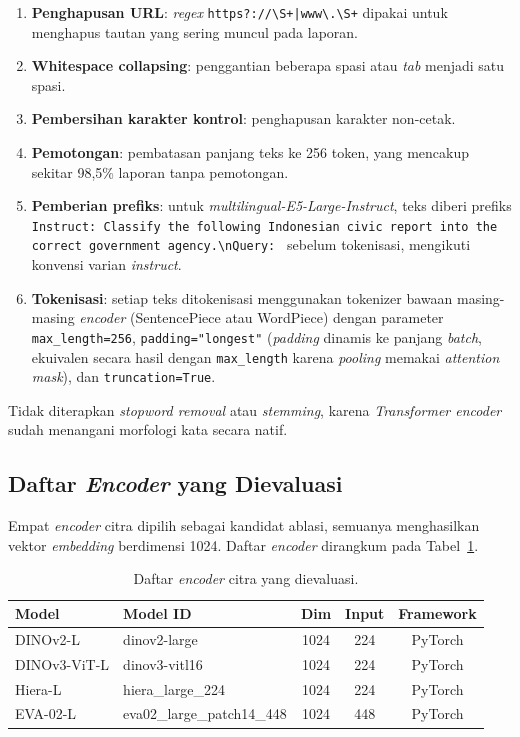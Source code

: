 \begin{enumerate}
    \item \textbf{Penghapusan URL}: \textit{regex} \texttt{https?://\textbackslash S+|www\textbackslash .\textbackslash S+} dipakai untuk menghapus tautan yang sering muncul pada laporan.
    \item \textbf{Whitespace collapsing}: penggantian beberapa spasi atau \textit{tab} menjadi satu spasi.
    \item \textbf{Pembersihan karakter kontrol}: penghapusan karakter non-cetak.
    \item \textbf{Pemotongan}: pembatasan panjang teks ke 256 token, yang mencakup sekitar 98,5\% laporan tanpa pemotongan.
    \item \textbf{Pemberian prefiks}: untuk \textit{multilingual-E5-Large-Instruct}, teks diberi prefiks \texttt{Instruct: Classify the following Indonesian civic report into the correct government agency.\textbackslash nQuery: } sebelum tokenisasi, mengikuti konvensi varian \textit{instruct}.
    \item \textbf{Tokenisasi}: setiap teks ditokenisasi menggunakan tokenizer bawaan masing-masing \textit{encoder} (SentencePiece atau WordPiece) dengan parameter \texttt{max\_length=256}, \texttt{padding="longest"} (\textit{padding} dinamis ke panjang \textit{batch}, ekuivalen secara hasil dengan \texttt{max\_length} karena \textit{pooling} memakai \textit{attention mask}), dan \texttt{truncation=True}.
\end{enumerate}

Tidak diterapkan \textit{stopword removal} atau \textit{stemming}, karena \textit{Transformer encoder} sudah menangani morfologi kata secara natif.

\subsection{Daftar \textit{Encoder} yang Dievaluasi}

Empat \textit{encoder} citra dipilih sebagai kandidat ablasi, semuanya menghasilkan vektor \textit{embedding} berdimensi 1024. Daftar \textit{encoder} dirangkum pada Tabel~\ref{tab:image-encoders}.

\begin{table}[htbp]
\centering
\caption{Daftar \textit{encoder} citra yang dievaluasi.}
\label{tab:image-encoders}
\small
\begin{tabular}{p{2.5cm} p{5.0cm} c c c}
\toprule
\textbf{Model} & \textbf{Model ID} & \textbf{Dim} & \textbf{Input} & \textbf{Framework} \\
\midrule
DINOv2-L & dinov2-large & 1024 & 224 & PyTorch \\
DINOv3-ViT-L & dinov3-vitl16 & 1024 & 224 & PyTorch \\
Hiera-L & hiera\_large\_224 & 1024 & 224 & PyTorch \\
EVA-02-L & eva02\_large\_patch14\_448 & 1024 & 448 & PyTorch \\
\bottomrule
\end{tabular}
\end{table}

